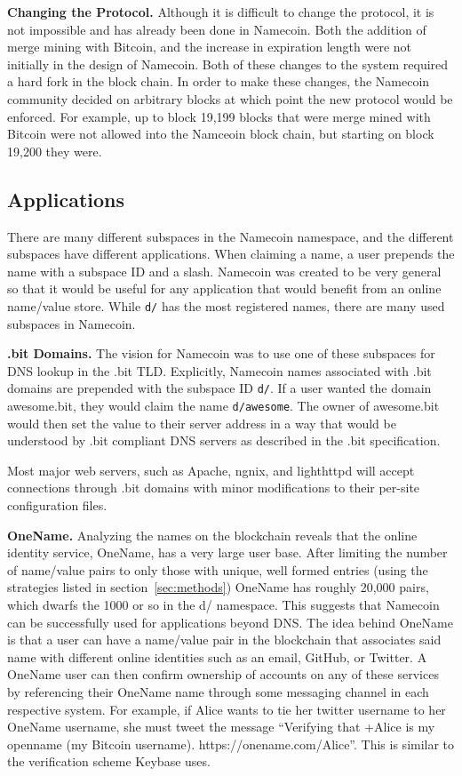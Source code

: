 {\bf Changing the Protocol.}
Although it is difficult to change the protocol, it is not impossible and has already been done in Namecoin. Both the addition of merge mining with Bitcoin, and the increase in expiration length were not initially in the design of Namecoin. Both of these changes to the system required a hard fork in the block chain. In order to make these changes, the Namecoin community decided on arbitrary blocks at which point the new protocol would be enforced. For example, up to block 19,199 blocks that were merge mined with Bitcoin were not allowed into the Namceoin block chain, but starting on block 19,200 they were. 
 
\subsection{Applications}

There are many different subspaces in the Namecoin namespace, and the different subspaces have different applications. When claiming a name, a user prepends the name with a subspace ID and a slash. Namecoin was created to be very general so that it would be useful for any application that would benefit from an online name/value store. While {\tt d/} has the most registered names, there are many used subspaces in Namecoin.

{\bf .bit Domains.}
The vision for Namecoin was to use one of these subspaces for DNS lookup in the .bit TLD. Explicitly, Namecoin names associated with .bit domains are prepended with the subspace ID {\tt d/}. If a user wanted the domain awesome.bit, they would claim the name {\tt d/awesome}. The owner of awesome.bit would then set the value to their server address in a way that would be understood by .bit compliant DNS servers as described in the .bit specification\cite{bitdnsspec}.

Most major web servers, such as Apache, ngnix, and lighthttpd will accept connections through .bit domains with minor modifications to their per-site configuration files.

{\bf OneName.}
Analyzing the names on the blockchain reveals that the online identity service, OneName, has a very large user base. After limiting the number of name/value pairs to only those with unique, well formed entries (using the strategies listed in section~\ref{sec:methods}) OneName has roughly 20,000 pairs, which dwarfs the 1000 or so in the d/ namespace. This suggests that Namecoin can be successfully used for applications beyond DNS. The idea behind OneName is that a user can have a name/value pair in the blockchain that associates said name with different online identities such as an email, GitHub, or Twitter. A OneName user can then confirm ownership of accounts on any of these services by referencing their OneName name through some messaging channel in each respective system. For example, if Alice wants to tie her twitter username to her OneName username, she must tweet the message ``Verifying that +Alice is my openname (my Bitcoin username). https://onename.com/Alice''. This is similar to the verification scheme Keybase uses.

